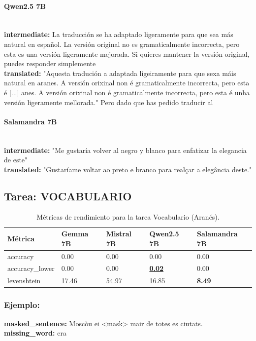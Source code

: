 \paragraph{Qwen2.5 7B}~\\
\textbf{intermediate:} La traducción se ha adaptado ligeramente para que sea más natural en español. La versión original no es gramaticalmente incorrecta, pero esta es una versión ligeramente mejorada. Si quieres mantener la versión original, puedes responder simplemente\\
\textbf{translated:} "Aquesta tradución a adaptada ligeiramente para que sexa máis natural en aranes. A versión orixinal non é gramaticalmente incorrecta, pero esta é  [...] anes. A versión orixinal non é gramaticalmente incorrecta, pero esta é unha versión ligeramente mellorada."   Pero dado que has pedido traducir al

\paragraph{Salamandra 7B}~\\
\textbf{intermediate:} "Me gustaría volver al negro y blanco para enfatizar la elegancia de este"\\
\textbf{translated:} "Gustaríame voltar ao preto e branco para realçar a elegância deste."

\subsection{Tarea: VOCABULARIO}\label{tarea-vocabulario}
\begin{longtable}[]{@{}lllll@{}}
\toprule\noalign{}
Métrica & Gemma 7B & Mistral 7B & Qwen2.5 7B & Salamandra 7B \\
\midrule\noalign{}
\endhead
\bottomrule\noalign{}
\caption{Métricas de rendimiento para la tarea Vocabulario (Aranés).}
\label{tab:metricas_vocabulario_Aranés}
\endlastfoot
accuracy & 0.00 & 0.00 & 0.00 & 0.00 \\
accuracy\_lower & 0.00 & 0.00 & \textbf{\underline{0.02}} & 0.00 \\
levenshtein & 17.46 & 54.97 & 16.85 & \textbf{\underline{8.49}} \\
\end{longtable}

\subsubsection{Ejemplo:}
\textbf{masked\_sentence:} Moscòu ei {\textless}mask{\textgreater} mair de totes es ciutats.\\
\textbf{missing\_word:} era

